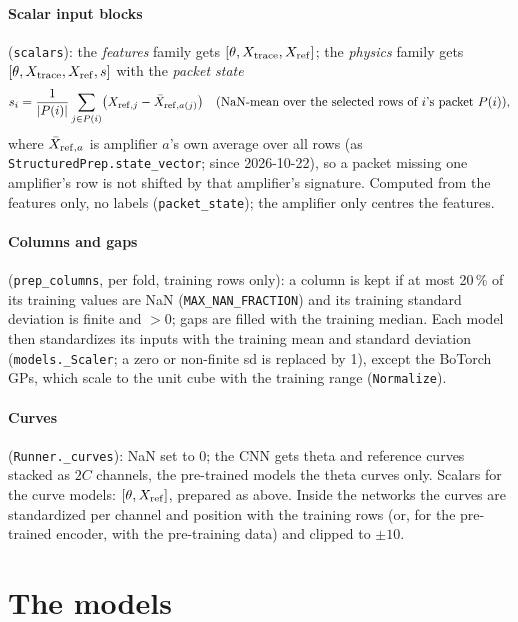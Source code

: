\documentclass[10pt]{article}
\newcommand{\code}[1]{\texttt{#1}}
\begin{document}
\paragraph{Scalar input blocks} (\code{scalars}): the \emph{features} family gets $[\theta, X_{\rm trace}, X_{\rm ref}]$;
the \emph{physics} family gets $[\theta, X_{\rm trace}, X_{\rm ref}, s]$ with the \emph{packet state}
\[ s_i = \frac{1}{|P(i)|}\sum_{j \in P(i)} \bigl(X_{{\rm ref},j} - \bar X_{{\rm ref},a(j)}\bigr)\quad\text{(NaN-mean over the selected rows of $i$'s packet $P(i)$)}, \]
where $\bar X_{{\rm ref},a}$ is amplifier $a$'s own average over all rows (as \code{StructuredPrep.state\_vector}; since
2026-10-22), so a packet missing one amplifier's row is not shifted by that amplifier's signature. Computed from the
features only, no labels (\code{packet\_state}); the amplifier only centres the features.

\paragraph{Columns and gaps} (\code{prep\_columns}, per fold, training rows only): a column is kept if at most 20\,\% of
its training values are NaN (\code{MAX\_NAN\_FRACTION}) and its training standard deviation is finite and $> 0$; gaps
are filled with the training median. Each model then standardizes its inputs with the training mean and standard
deviation (\code{models.\_Scaler}; a zero or non-finite sd is replaced by 1), except the BoTorch GPs, which scale to the
unit cube with the training range (\code{Normalize}).

\paragraph{Curves} (\code{Runner.\_curves}): NaN set to 0; the CNN gets theta and reference curves stacked as $2C$
channels, the pre-trained models the theta curves only. Scalars for the curve models: $[\theta, X_{\rm ref}]$, prepared
as above. Inside the networks the curves are standardized per channel and position with the training rows (or, for the
pre-trained encoder, with the pre-training data) and clipped to $\pm10$.

\section{The models}
\label{sec:models}
\end{document}
